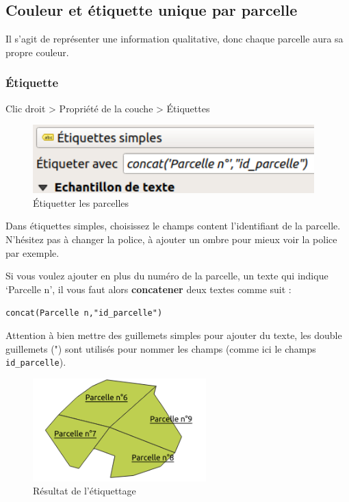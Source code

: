 \hypertarget{couleur-et-uxe9tiquette-unique-par-parcelle}{%
\subsection{Couleur et étiquette unique par
parcelle}\label{couleur-et-uxe9tiquette-unique-par-parcelle}}

Il s'agit de représenter une information qualitative, donc chaque
parcelle aura sa propre couleur.

\hypertarget{uxe9tiquette}{%
\subsubsection{Étiquette}\label{uxe9tiquette}}

Clic droit \textgreater{} Propriété de la couche \textgreater{}
Étiquettes

\begin{figure}
\centering
\includegraphics[width=\textwidth,height=1.04167in]{figures/etiquette_parcelle.png}
\caption{Étiquetter les parcelles}
\end{figure}

Dans étiquettes simples, choisissez le champs content l'identifiant de
la parcelle. N'hésitez pas à changer la police, à ajouter un ombre pour
mieux voir la police par exemple.

Si vous voulez ajouter en plus du numéro de la parcelle, un texte qui
indique `Parcelle n', il vous faut alors \textbf{concatener} deux textes
comme suit :

\texttt{concat(\textquotesingle{}Parcelle\ n\textquotesingle{},"id\_parcelle")}

Attention à bien mettre des guillemets simples pour ajouter du texte,
les double guillemets (") sont utilisés pour nommer les champs (comme
ici le champs \texttt{id\_parcelle}).

\begin{figure}
\centering
\includegraphics[width=\textwidth,height=1.5625in]{figures/parcelle_num.png}
\caption{Résultat de l'étiquettage}
\end{figure}

